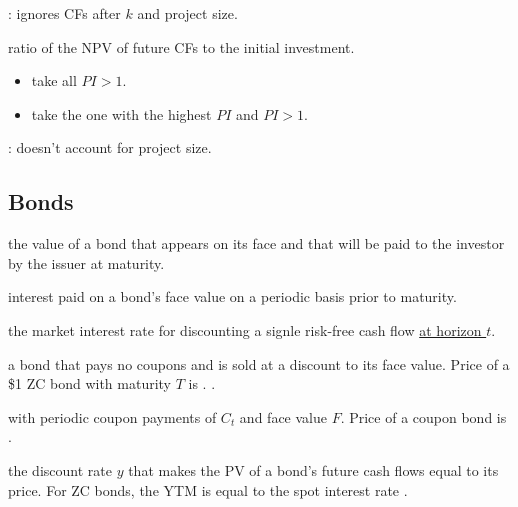 : ignores CFs after $k$ and project size.

 ratio of the NPV of future CFs to the initial investment.
\begin{itemize}
    \item {} take all $PI > 1$.
    \item {} take the one with the highest $PI$ and $PI > 1$.
\end{itemize}

: doesn't account for project size.

\subsection{Bonds}

 the value of a bond that appears on its face and that will be paid to the investor by the issuer at
maturity.

 interest paid on a bond's face value on a periodic basis prior to maturity.

 the market interest rate for discounting a signle risk-free cash flow
\underline{at horizon $t$}.

 a bond that pays no coupons and is sold at a discount to its face value.
Price of a \$1 ZC bond with maturity $T$ is .
.

 with periodic coupon payments of $C_t$ and face value $F$.
Price of a coupon bond is
.

 the discount rate $y$ that makes the PV of a bond's future cash flows equal to its price.
 For ZC bonds, the YTM is equal to the spot interest rate .

